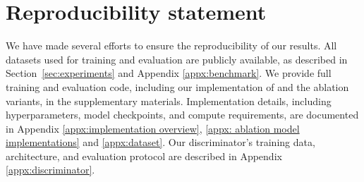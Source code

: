 \section{Reproducibility statement}

We have made several efforts to ensure the reproducibility of our results. All datasets used for training and evaluation are publicly available, as described in Section~\ref{sec:experiments} and Appendix \ref{appx:benchmark}. We provide full training and evaluation code, including our implementation of \method and the ablation variants, in the supplementary materials. Implementation details, including hyperparameters, model checkpoints, and compute requirements, are documented in Appendix \ref{appx:implementation overview}, \ref{appx: ablation model implementations} and \ref{appx:dataset}. Our discriminator's training data, architecture, and evaluation protocol are described in Appendix \ref{appx:discriminator}.